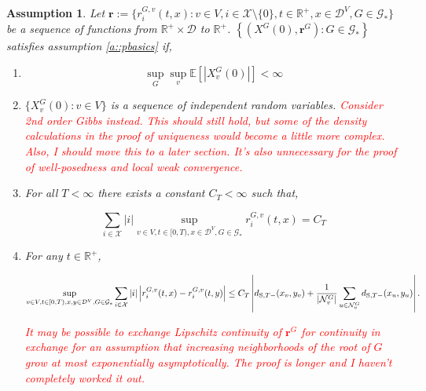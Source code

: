 \documentclass[12pt]{article}
\newcommand{\mb}{\mathbb}
\newcommand{\mc}{\mathcal}
\newcommand{\te}{\text}
\newcommand{\tr}{\textcolor{red}}
\newcommand{\ex}[1]{\mb{E}\left[#1\right]}			%
\newcommand{\defeq}{:=}								%
\newcommand{\cad}{\mc{D}}							%
\newcommand{\sta}{\mc{X}}							%
\newcommand{\gneigh}[2]{\mc{N}^{#1}_{#2}}			%
\newcommand{\Xf}{X}									%
\newcommand{\rate}{r}								%
\newcommand{\stmet}[1]{
\ifstrempty{#1}{
	d_{\te{S}}}{
	d_{\te{S},#1}}}									%
\newcommand{\xf}{x}									%
\newcommand{\xg}{y}									%
\newcommand{\vind}[1]{_{#1}}						%
\newcommand{\tme}[1]{(#1)}							%
\newcommand{\gind}[1]{^{#1}}						%
\newcommand{\vpara}[1]{^{#1}}						%
\newcommand{\stpara}[1]{_{#1}}						%
\newcommand{\gvpara}[2]{^{#1,#2}}					%
\newcommand{\rateset}{\mathbf{\rate}}				%
\newcommand{\jumpbd}[1]{C_{#1}}						%
\newcommand{\tmepro}[2]{(#1,#2)}					%
\newcommand{\Gs}{\mc{G}_\ast}						%
\newtheorem{assu}[thms]{Assumption}
\begin{document}
\begin{assu}
Let \(\rateset \defeq \{\rate\gvpara{G}{v}\stpara{i}\tmepro{t}{x}:v \in V,i \in \sta\setminus\{0\},t \in \mb{R}^+, x \in \cad\vpara{V}, G \in \Gs\}\) be a sequence of functions from \(\mb{R}^+\times \cad\) to \(\mb{R}^+\). \(\left\{(\Xf\gind{G}\tme{0},\rateset\gind{G}): G \in \Gs\right\}\) satisfies assumption \ref{a::pbasics} if,

\begin{enumerate}
\item 

\begin{equation}
\sup_G\sup_v \ex{|\Xf\gind{G}\vind{v}\tme{0}|} < \infty
\label{a::bddstart}
\end{equation}

\item \(\{\Xf\gind{G}\vind{v}\tme{0}:v \in V\}\) is a sequence of independent random variables. \tr{Consider 2nd order Gibbs instead. This should still hold, but some of the density calculations in the proof of uniqueness would become a little more complex.} \tr{Also, I should move this to a later section. It's also unnecessary for the proof of well-posedness and local weak convergence.}

\item For all \(T < \infty\) there exists a constant \(\jumpbd{T} < \infty\) such that,

\begin{equation}
\sum_{i \in \sta}|i|\sup_{v \in V,t \in [0,T),\xf \in \cad\vpara{V},G \in \Gs} \rate\gvpara{G}{v}\stpara{i}\tmepro{t}{\xf} = \jumpbd{T}
\label{a::bddjmp}
\end{equation}

\item For any \(t \in \mb{R}^+\),

\begin{equation}
\sup_{v \in V,t \in [0,T),\xf,\xg \in \cad\vpara{V},G \in \Gs} \sum_{i \in \sta}|i|\left|\rate\gvpara{G}{v}\stpara{i}\tmepro{t}{\xf} - \rate\gvpara{G}{v}\stpara{i}\tmepro{t}{\xg}\right| \leq \jumpbd{T}\left|\stmet{T-}(\xf\vind{v},\xg\vind{v}) + \frac{1}{|\gneigh{G}{v}|}\sum_{u\in\gneigh{G}{v}} \stmet{T-}(\xf\vind{u},\xg\vind{u})\right|.
\label{a::Lipschitz}
\end{equation}

\tr{It may be possible to exchange Lipschitz continuity of \(\rateset\gind{G}\) for continuity in exchange for an assumption that increasing neighborhoods of the root of \(G\) grow at most exponentially asymptotically. The proof is longer and I haven't completely worked it out.}


\end{enumerate}
\end{assu}
\end{document}
